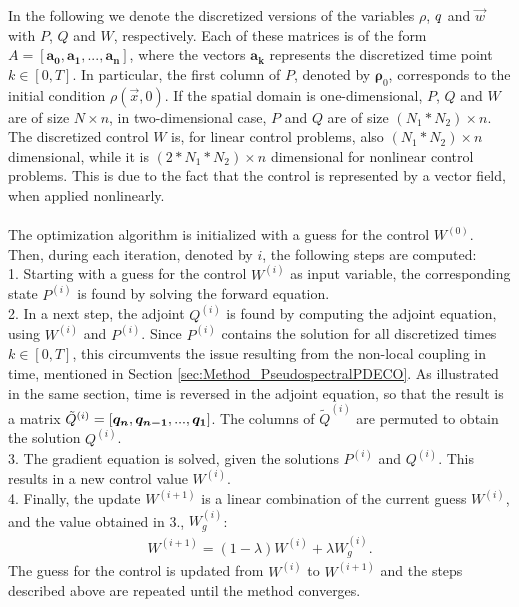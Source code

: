 In the following we denote the discretized versions of the variables $\rho$, $q$ and $\vec{w}$ with $P$, $Q$ and $W$, respectively. Each of these matrices is of the form $A = [\boldsymbol{a_0}, \boldsymbol{a_1}, ... ,\boldsymbol{a_n}]$, where the vectors $\boldsymbol{a_k}$ represents the discretized time point $k \in [0,T]$. In particular, the first column of $P$, denoted by $\boldsymbol{\rho}_0$, corresponds to the initial condition $\rho(\vec{x},0)$. If the spatial domain is one-dimensional, $P$, $Q$ and $W$ are of size $N \times n$, in two-dimensional case, $P$ and $Q$ are of size $(N_1*N_2) \times n$. The discretized control $W$ is, for linear control problems, also $(N_1*N_2) \times n$ dimensional, while it is $(2*N_1*N_2) \times n$ dimensional for nonlinear control problems. This is due to the fact that the control is represented by a vector field, when applied nonlinearly.
\\
\\
The optimization algorithm is initialized with a guess for the control $W^{(0)}$. Then, during each iteration, denoted by $i$, the following steps are computed:\\
1. Starting with a guess for the control $W^{(i)}$ as input variable, the corresponding state $P^{(i)}$ is found by solving the forward equation.\\
2. In a next step, the adjoint $Q^{(i)}$ is found by computing the adjoint equation, using $W^{(i)}$ and $P^{(i)}$. Since $P^{(i)}$ contains the solution for all discretized times $k \in [0,T]$, this circumvents the issue resulting from the non-local coupling in time, mentioned in Section \ref{sec:Method_PseudospectralPDECO}. As illustrated in the same section, time is reversed in the adjoint equation, so that the result is a matrix $\tilde{Q}^{(i)} =  [\boldsymbol{q_n},\boldsymbol{q_{n-1}}, ..., \boldsymbol{q_1} ]$. The columns of $\tilde{Q}^{(i)}$ are permuted to obtain the solution  $Q^{(i)}$.\\
3. The gradient equation is solved, given the solutions $P^{(i)}$ and $Q^{(i)}$. This results in a new control value $W^{(i)}$. \\
4. Finally, the update $W^{(i+1)}$ is a linear combination of the current guess $W^{(i)}$, and the value obtained in 3., $W^{(i)}_{g}$:
\begin{align*}
W^{(i+1)} = (1-\lambda)W^{(i)} + \lambda W^{(i)}_{g}.
\end{align*}
The guess for the control is updated from $W^{(i)} $ to $W^{(i+1)} $ and the steps described above are repeated until the method converges. 
